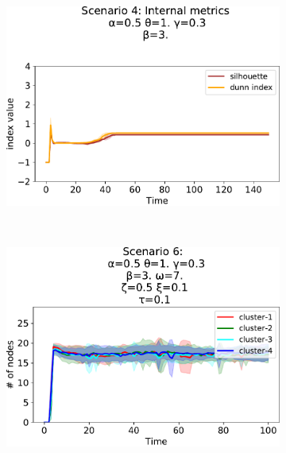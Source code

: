 \begin{figure}[!ht]
\begin{subfigure}[b]{0.32\textwidth}
    \includegraphics[width=\textwidth]{papers/swarm-intelligence2021/img/simulations/overlay-metrics_0_0910_α-0.5_θ-1._γ-0.3_β-3._ω-0._ζ-0..pdf}
  \end{subfigure}
  \\
  \begin{subfigure}[b]{0.32\textwidth}
    \centering
    \includegraphics[width=\textwidth]{papers/swarm-intelligence2021/img/simulations/movement-count_0_03456_α-0.5_θ-1._γ-0.3_β-3._ω-7._ζ-0.5.pdf}
  \end{subfigure}
  \hfill
  \begin{subfigure}[b]{0.32\textwidth}
    \centering

\end{subfigure}
\end{figure}
